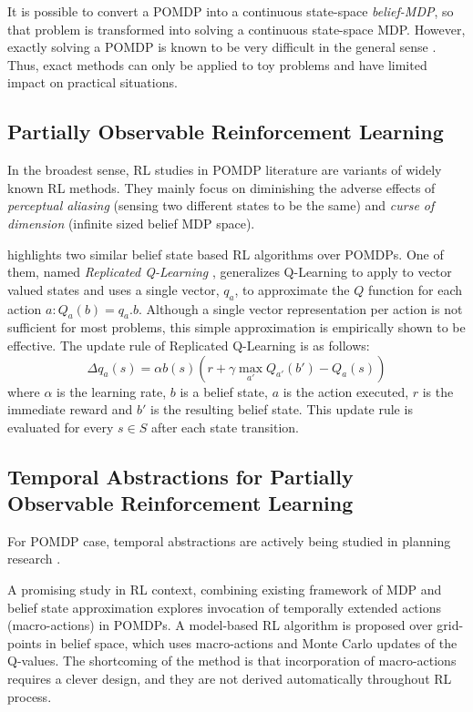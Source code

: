 \documentclass[10pt, conference, compsocconf]{IEEEtran}
\begin{document}
It is possible to convert a POMDP into a continuous state-space \textit{belief-MDP}, so that problem is transformed into solving a continuous state-space MDP. However, exactly solving a POMDP is known to be very difficult in the general sense \cite{kaelbling_planning_1998}. Thus, exact methods can only be applied to toy problems and have limited impact on practical situations. 


\subsection{Partially Observable Reinforcement Learning}
\label{sec:rl_under_pomdp}


In the broadest sense, RL studies in POMDP literature are variants of widely known RL methods. They mainly focus on diminishing the adverse effects of \textit{perceptual aliasing} (sensing two different states to be the same) and \textit{curse of dimension} (infinite sized belief MDP space).

\cite{littman_learning_1998} highlights two similar belief state based RL algorithms over POMDPs. One of them, named \textit{Replicated Q-Learning}  \cite{chrisman_reinforcement_1992}, generalizes Q-Learning to apply to vector valued states and uses a single vector, $q_a$, to approximate the $Q$ function for each action $a: Q_a(b)=q_{a}.b$. Although a single vector representation per action is not sufficient for most problems, this simple approximation is empirically shown to be effective. The update rule of Replicated Q-Learning is as follows:
\begin{equation}
\label{eqn:replicatedQ_update_rule}
\Delta q_a(s)=\alpha b(s)(r+\gamma \max_{a'} Q_{a'}(b')-Q_a(s))
\end{equation}
where $\alpha$ is the learning rate, $b$ is a belief state, $a$ is the action executed, $r$ is the immediate reward and $b'$ is the resulting belief state. This update rule is evaluated for every $s \in S$ after each state transition.



\subsection{Temporal Abstractions for Partially Observable Reinforcement Learning}
\label{sec:HRL_POMDP}
For POMDP case, temporal abstractions are actively being studied in planning research \cite{charlin_automated_2007}.

A promising study in RL context, combining existing framework of MDP and belief state approximation \cite{theocharous_approximate_2004} explores invocation of temporally extended actions (macro-actions) in POMDPs. A model-based RL algorithm is proposed over grid-points in belief space, which uses macro-actions and Monte Carlo updates of the Q-values.  The shortcoming of the method is that incorporation of macro-actions requires a clever design, and they are not derived automatically throughout RL process.
\end{document}
